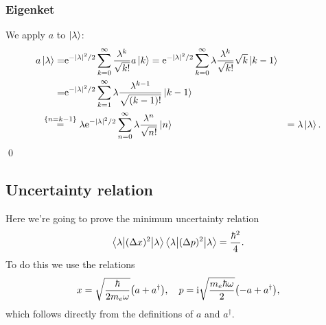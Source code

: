 \documentclass[11pt,letter, swedish, english
]{article}
\begin{document}
\subsubsection{Eigenket}
We apply $a$ to $\ket\lambda$:
\begin{equation}\label{eq:2_eigenket}
\begin{aligned}
a\ket\lambda =& \ee^{-|\lambda|^2/2}\sum_{k=0}^\infty
\frac{\lambda^k}{\sqrt{k!}} a \ket{k}
= \ee^{-|\lambda|^2/2}\sum_{k=0}^\infty
\lambda\frac{\lambda^{k}}{\sqrt{k!}}\sqrt{k} \ket{k-1}\\
=& \ee^{-|\lambda|^2/2}\sum_{k=1}^\infty
\lambda\frac{\lambda^{k-1}}{\sqrt{(k-1)!}} \ket{k-1}\\
&\hspace{-24pt}\stackrel{\{n=k-1\}}{=} \lambda \ee^{-|\lambda|^2/2}\sum_{n=0}^\infty
\lambda\frac{\lambda^{n}}{\sqrt{n!}} \ket{n}
&=\lambda\ket{\lambda}.
\end{aligned}
\end{equation}
\qed

\subsection{Uncertainty relation}
Here we're going to prove the minimum uncertainty relation
\begin{equation}\label{eq:2_unc}
\ev**{(\Delta{x})^2}{\lambda}\ev**{(\Delta{p})^2}{\lambda}
=\frac{\hbar^2}{4}.
\end{equation}
To do this we use the relations
\begin{equation}\label{eq:2_xp}
x=\sqrt{\frac{\hbar}{2m_e\omega}}\qty(a+a^\dagger)\qcomma
p=\ii\sqrt{\frac{m_e\hbar\omega}{2}}\qty(-a+a^\dagger),
\end{equation}
which follows directly from the definitions of $a$ and $a^\dagger$.
\end{document}
